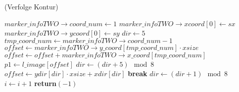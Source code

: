 \begin{algorithm}[ht]
\caption{ (Verfolge Kontur)}
\label{alg:argetcontour-2}
\begin{algorithmic}[1]
	\State $\mathit{marker\_infoTWO \to coord\_num} \gets 1$
	\label{alg:argetcontour-2-markerinit-start}
	\State $\mathit{marker\_infoTWO \to xcoord}\left[0\right] \gets \mathit{sx}$
	\State $\mathit{marker\_infoTWO \to ycoord}\left[0\right] \gets \mathit{sy}$
	\label{alg:argetcontour-2-markerinit-end}
	\State $\mathit{dir} \gets 5$
	\label{alg:argetcontour-2-orientation}
	\label{alg:argetcontour-2-contourloop-start}
		\State $\mathit{tmp\_coord\_num} \gets \mathit{marker\_infoTWO \to coord\_num} - 1$
		\label{alg:argetcontour-2-offset-start}
		\State $\mathit{offset} \gets \mathit{marker\_infoTWO \to y\_coord}\left[\mathit{tmp\_coord\_num}\right] \cdot
		 \mathit{xsize}$
		\State $\mathit{offset} \gets \mathit{offset} + \mathit{marker\_infoTWO \to
		 x\_coord}\left[\mathit{tmp\_coord\_num}\right]$
		\label{alg:argetcontour-2-offset-end}
		\State $\mathit{p1} \gets \mathit{l\_image}[\mathit{offset}]$
		\label{alg:argetcontour-2-address}
		\State $\mathit{dir} \gets \left(\mathit{dir} + 5\right)\mod 8$
		\label{alg:argetcontour-2-nextorientation}
		\label{alg:argetcontour-2-neighbourloop-start}
			\State $\mathit{offset} \gets \mathit{ydir}\left[dir\right] \cdot \mathit{xsize} +
			 \mathit{xdir}\left[\mathit{dir}\right]$
			\label{alg:argetcontour-2-offset}
			\label{alg:argetcontour-2-haslabel-start}
				\State \textbf{break}
			\EndIf
			\label{alg:argetcontour-2-haslabel-end}
			\State $\mathit{dir} \gets \left(\mathit{dir} + 1\right)\mod 8$
			\label{alg:argetcontour-2-incdir}
			\State $i \gets i + 1$
			\label{alg:argetcontour-2-inci}
		\EndFor
		\label{alg:argetcontour-2-neighbourloop-end}
		\label{alg:argetcontour-2-hasnolabel-start}
			\State \textbf{return}$(-1)$
		\EndIf
		\label{alg:argetcontour-2-hasnolabel-end}

\end{algorithmic}
\end{algorithm}
